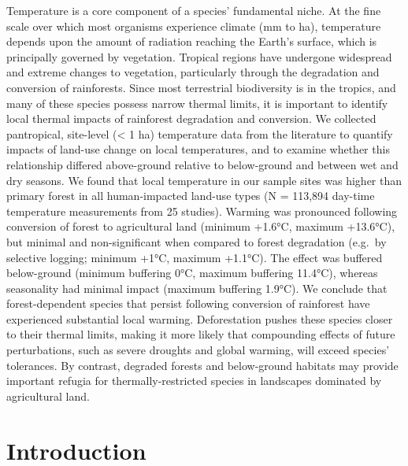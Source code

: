 \documentclass[12pt,a4paper,]{report}
\theoremstyle{definition}
\theoremstyle{definition}
\theoremstyle{definition}
\theoremstyle{remark}
\begin{document}
Temperature is a core component of a species' fundamental niche. At the
fine scale over which most organisms experience climate (mm to ha),
temperature depends upon the amount of radiation reaching the Earth's
surface, which is principally governed by vegetation. Tropical regions
have undergone widespread and extreme changes to vegetation,
particularly through the degradation and conversion of rainforests.
Since most terrestrial biodiversity is in the tropics, and many of these
species possess narrow thermal limits, it is important to identify local
thermal impacts of rainforest degradation and conversion. We collected
pantropical, site-level (\textless{} 1 ha) temperature data from the
literature to quantify impacts of land-use change on local temperatures,
and to examine whether this relationship differed above-ground relative
to below-ground and between wet and dry seasons. We found that local
temperature in our sample sites was higher than primary forest in all
human-impacted land-use types (N = 113,894 day-time temperature
measurements from 25 studies). Warming was pronounced following
conversion of forest to agricultural land (minimum +1.6°C, maximum
+13.6°C), but minimal and non-significant when compared to forest
degradation (e.g.~by selective logging; minimum +1°C, maximum +1.1°C).
The effect was buffered below-ground (minimum buffering 0°C, maximum
buffering 11.4°C), whereas seasonality had minimal impact (maximum
buffering 1.9°C). We conclude that forest-dependent species that persist
following conversion of rainforest have experienced substantial local
warming. Deforestation pushes these species closer to their thermal
limits, making it more likely that compounding effects of future
perturbations, such as severe droughts and global warming, will exceed
species' tolerances. By contrast, degraded forests and below-ground
habitats may provide important refugia for thermally-restricted species
in landscapes dominated by agricultural land.

\section{Introduction}\label{introduction}
\end{document}
